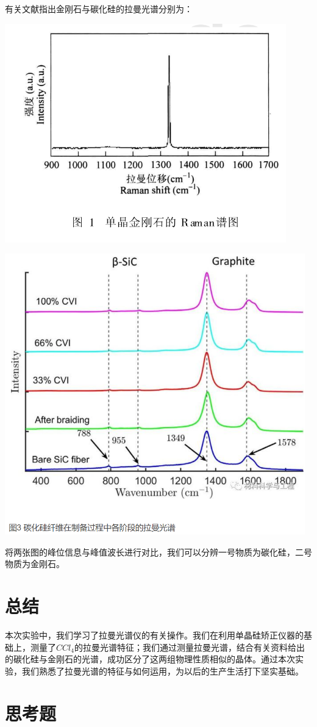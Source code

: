 \documentclass[hyperref]{ctexart}
\begin{document}
\begin{multicols}{2}
		有关文献指出金刚石与碳化硅的拉曼光谱分别为：
		
		\includegraphics[width = 0.75\linewidth]{Riemann_C.png}
		
		\includegraphics[width = 0.75\linewidth]{Riemann_SiC.png}
		
		将两张图的峰位信息与峰值波长进行对比，我们可以分辨一号物质为碳化硅，二号物质为金刚石。
		
		\section{总结}
		
		本次实验中，我们学习了拉曼光谱仪的有关操作。我们在利用单晶硅矫正仪器的基础上，测量了$CCl_4$的拉曼光谱特征；我们通过测量拉曼光谱，结合有关资料给出的碳化硅与金刚石的光谱，成功区分了这两组物理性质相似的晶体。通过本次实验，我们熟悉了拉曼光谱的特征与如何运用，为以后的生产生活打下坚实基础。
		
		\section{思考题}

\end{multicols}
\end{document}
